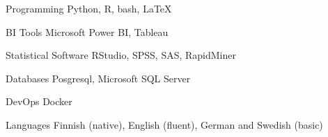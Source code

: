 

\begin{cvskills}

  \cvskill
    {Programming} %
    {Python, R, bash, LaTeX} %

  \cvskill
    {BI Tools} %
    {Microsoft Power BI, Tableau} %

  \cvskill
    {Statistical Software} %
    {RStudio, SPSS, SAS, RapidMiner} %

  \cvskill
    {Databases} %
    {Posgresql, Microsoft SQL Server} %

  \cvskill
    {DevOps} %
    {Docker} %

  \cvskill
    {Languages} %
    {Finnish (native), English (fluent), German and Swedish (basic)} %

\end{cvskills}
